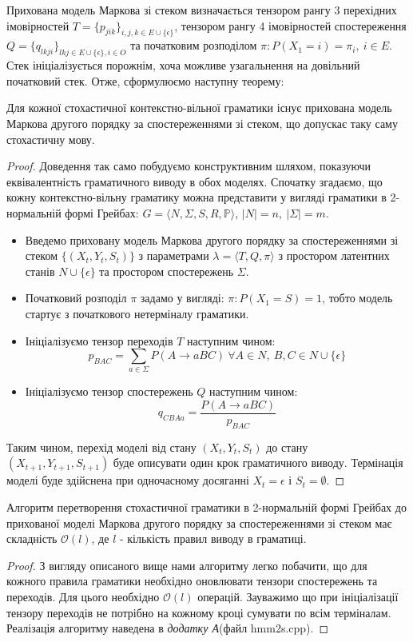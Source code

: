 Прихована модель Маркова зі стеком визначається тензором рангу 3 перехідних імовірностей $T = \{ p_{jik} \}_{i,j,k \in E \cup \{ \epsilon \} }$, тензором рангу 4 імовірностей спостереження $Q = \{ q_{lkji} \}_{lkj \in E \cup \{ \epsilon \}, i \in O }$ та початковим розподілом $ \pi \colon P(X_1 = i) = \pi_i,\ i \in E $. Стек ініціалізується порожнім, хоча можливе узагальнення на довільний початковий стек.
Отже, сформулюємо наступну теорему:
\begin{theorem}
  Для кожної стохастичної контекстно-вільної граматики існує прихована модель Маркова другого порядку за спостереженнями зі стеком, що допускає таку саму стохастичну мову.
\end{theorem}
\begin{proof}
  Доведення так само побудуємо конструктивним шляхом, показуючи еквівалентність граматичного виводу в обох моделях. Спочатку згадаємо, що кожну контекстно-вільну граматику можна представити у вигляді граматики в 2-нормальній формі Грейбах: $ G = \big\langle N, \Sigma, S, R, \mathbb{P}\big\rangle $, $|N| = n,\ |\Sigma| = m $.
  \begin{itemize}
    \item Введемо приховану модель Маркова другого порядку за спостереженнями зі стеком $ \{ (X_t, Y_t, S_t) \} $ з параметрами $\lambda = \big\langle T, Q, \pi \big\rangle$ з простором латентних станів $N \cup \{ \epsilon \}$ та простором спостережень $\Sigma$.
    \item Початковий розподіл $\pi$ задамо у вигляді: $ \pi \colon P(X_1 = S) = 1 $, тобто модель стартує з початкового нетерміналу граматики.
    \item Ініціалізуємо тензор переходів $T$ наступним чином:
    $$ p_{BAC} = \sum_{a \in \Sigma} P(A \rightarrow a B C) \ \forall A \in N,\ B, C \in N \cup \{ \epsilon \} $$
    \item Ініціалізуємо тензор спостережень $Q$ наступним чином:
    $$ q_{CBAa} = \frac{P(A \rightarrow a B C)}{p_{BAC}} $$
  \end{itemize}
  Таким чином, перехід моделі від стану $(X_t, Y_t, S_t)$ до стану $(X_{t+1}, Y_{t+1}, S_{t+1})$ буде описувати один крок граматичного виводу. Термінація моделі буде здійснена при одночасному досяганні $ X_t = \epsilon$ і $S_t = \emptyset $.
\end{proof}
\begin{claim}
  Алгоритм перетворення стохастичної граматики в 2-нормальній формі Грейбах до прихованої моделі Маркова другого порядку за спостереженнями зі стеком має складність $\mathcal{O}(l)$, де $l$ - кількість правил виводу в граматиці.
\end{claim}
\begin{proof}
  З вигляду описаного вище нами алгоритму легко побачити, що для кожного правила граматики необхідно оновлювати тензори спостережень та переходів. Для цього необхідно $ \mathcal{O}(l) $ операцій. Зауважимо що при ініціалізації тензору переходів не потрібно на кожному кроці сумувати по всім терміналам. Реалізація алгоритму наведена в \textit{додатку А}(файл hmm2s.cpp).
\end{proof}

